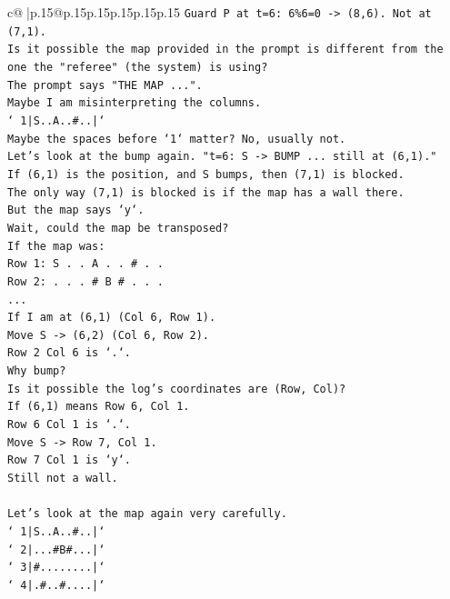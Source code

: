 \documentclass{article}
\begin{document}
{\begin{supertabular}{c@{$\;$}|p{.15\linewidth}@{}p{.15\linewidth}p{.15\linewidth}p{.15\linewidth}p{.15\linewidth}p{.15\linewidth}}
{{{\texttt{Guard P at t=6: 6\%6=0 {-}> (8,6). Not at (7,1).} \\
\texttt{Is it possible the map provided in the prompt is different from the one the "referee" (the system) is using?} \\
\texttt{The prompt says "THE MAP ...".} \\
\texttt{Maybe I am misinterpreting the columns.} \\
\texttt{` 1|S..A..\#..|`} \\
\texttt{Maybe the spaces before `1` matter? No, usually not.} \\
\texttt{Let's look at the bump again. "t=6: S {-}> BUMP ... still at (6,1)."} \\
\texttt{If (6,1) is the position, and S bumps, then (7,1) is blocked.} \\
\texttt{The only way (7,1) is blocked is if the map has a wall there.} \\
\texttt{But the map says `y`.} \\
\texttt{Wait, could the map be transposed?} \\
\texttt{If the map was:} \\
\texttt{Row 1: S . . A . . \# . .} \\
\texttt{Row 2: . . . \# B \# . . .} \\
\texttt{...} \\
\texttt{If I am at (6,1) (Col 6, Row 1).} \\
\texttt{Move S {-}> (6,2) (Col 6, Row 2).} \\
\texttt{Row 2 Col 6 is `.`.} \\
\texttt{Why bump?} \\
\texttt{Is it possible the log's coordinates are (Row, Col)?} \\
\texttt{If (6,1) means Row 6, Col 1.} \\
\texttt{Row 6 Col 1 is `.`.} \\
\texttt{Move S {-}> Row 7, Col 1.} \\
\texttt{Row 7 Col 1 is `y`.} \\
\texttt{Still not a wall.} \\
\\ 
\texttt{Let's look at the map again very carefully.} \\
\texttt{` 1|S..A..\#..|`} \\
\texttt{` 2|...\#B\#...|`} \\
\texttt{` 3|\#........|`} \\
\texttt{` 4|.\#..\#....|`} \\
}}}
\end{supertabular}}
\end{document}
